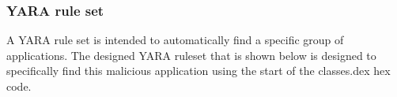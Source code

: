 \subsubsection{YARA rule set}
A YARA rule set is intended to automatically find a specific group of applications.
The designed YARA ruleset that is shown below is designed to specifically find this malicious application using the start of the classes.dex hex code.

